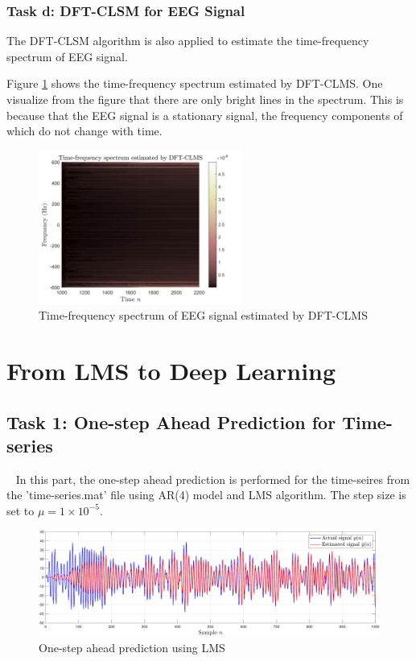 \documentclass[10pt]{article}
\begin{document}
\subsubsection{Task d: DFT-CLSM for EEG Signal}

The DFT-CLSM algorithm is also applied to estimate the time-frequency spectrum
of EEG signal.

Figure \ref{fig26} shows the time-frequency spectrum estimated by DFT-CLMS.
One visualize from the figure that there are only bright lines in the spectrum.
This is because that the EEG signal is a stationary signal, the frequency components of which
do not change with time. 


\begin{figure}[htbp]
    \centering
	\includegraphics[width=0.6\textwidth]{fig/3.3_2.png}

    \caption{Time-frequency spectrum of EEG signal estimated by DFT-CLMS}
    \label{fig26}
\end{figure}

\newpage

\section{From LMS to Deep Learning}

\subsection{Task 1: One-step Ahead Prediction for Time-series} \label{part4.1}
\ \indent
In this part, the one-step ahead prediction is performed for the time-seires 
from the 'time-series.mat' file using AR(4) model and LMS algorithm. The step size
is set to $\mu=1\times 10^{-5}$.

\begin{figure}[htbp]
    \centering
	\includegraphics[width=1\textwidth]{fig/4.1_1.pdf}

    \caption{One-step ahead prediction using LMS}
    \label{fig27}
\end{figure}
\end{document}

